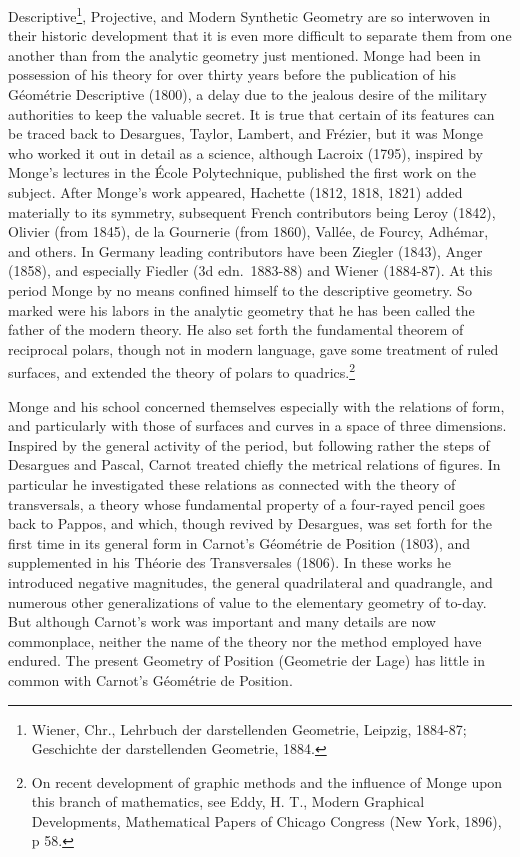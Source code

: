 \documentclass[oneside]{book}
\begin{document}
Descriptive\footnote{Wiener, Chr., Lehrbuch der darstellenden
Geometrie, Leipzig, 1884-87; Geschichte der darstellenden
Geometrie, 1884.}, Projective, and Modern Synthetic Geometry are so
interwoven in their historic development that it is even more
difficult to separate them from one another than from the analytic
geometry just mentioned. Monge had been in possession of his theory
for over thirty years before the publication of his G\'eom\'etrie
Descriptive (1800), a delay due to the jealous desire of the
military authorities to keep the valuable secret. It is true that
certain of its features can be traced back to Desargues, Taylor,
Lambert, and Fr\'ezier, but it was Monge who worked it out in detail
as a science, although Lacroix (1795), inspired by Monge's lectures
in the \'Ecole Polytechnique, published the first work on the
subject. After Monge's work appeared, Hachette (1812, 1818, 1821)
added materially to its symmetry, subsequent French contributors
being Leroy (1842), Olivier (from 1845), de la Gournerie (from
1860), Vall\'ee, de Fourcy, Adh\'emar, and others. In Germany leading
contributors have been Ziegler (1843), Anger (1858), and especially
Fiedler (3d edn.~1883-88) and Wiener (1884-87). At this period
Monge by no means confined himself to the descriptive geometry. So
marked were his labors in the analytic geometry that he has been
called the father of the modern theory. He also set forth the
fundamental theorem of reciprocal polars, though not in modern
language, gave some treatment of ruled surfaces, and extended the
theory of polars to quadrics.\footnote{On recent development of
graphic methods and the influence of Monge upon this branch of
mathematics, see Eddy, H. T., Modern Graphical Developments,
Mathematical Papers of Chicago Congress (New York, 1896), p 58.}

Monge and his school concerned themselves especially with the
relations of form, and particularly with those of surfaces and
curves in a space of three dimensions. Inspired by the general
activity of the period, but following rather the steps of Desargues
and Pascal, Carnot treated chiefly the metrical relations of
figures. In particular he investigated these relations as connected
with the theory of transversals, a theory whose fundamental property
of a four-rayed pencil goes back to Pappos, and which, though
revived by Desargues, was set forth for the first time in its
general form in Carnot's G\'eom\'etrie de Position (1803), and
supplemented in his Th\'eorie des Transversales (1806). In these
works he introduced negative magnitudes, the general quadrilateral
and quadrangle, and numerous other generalizations of value to the
elementary geometry of to-day. But although Carnot's work was
important and many details are now commonplace, neither the name of
the theory nor the method employed have endured. The present
Geometry of Position (Geometrie der Lage) has little in common with
Carnot's G\'eom\'etrie de Position.
\end{document}
